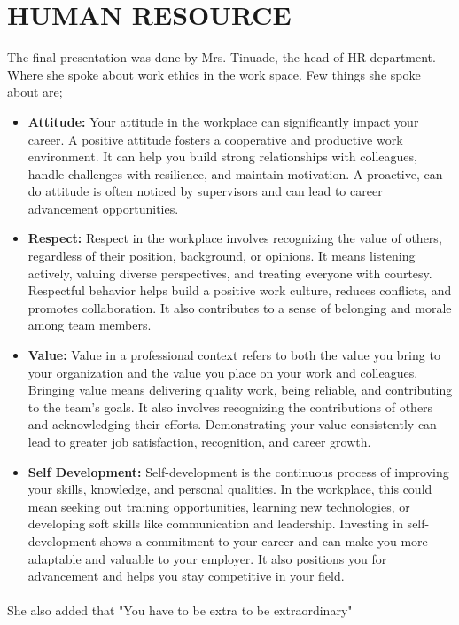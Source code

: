 \documentclass[a4paper,12pt]{report}
\begin{document}
\section[Human resource]{HUMAN RESOURCE}
The final presentation was done by Mrs. Tinuade, the head of HR department. Where she spoke about work ethics in the work space. Few things she spoke about are;
\begin{itemize}
    \item \textbf{Attitude:} Your attitude in the workplace can significantly impact your career. A positive attitude fosters a cooperative and productive work environment. It can help you build strong relationships with colleagues, handle challenges with resilience, and maintain motivation. A proactive, can-do attitude is often noticed by supervisors and can lead to career advancement opportunities.
    \item \textbf{Respect:} Respect in the workplace involves recognizing the value of others, regardless of their position, background, or opinions. It means listening actively, valuing diverse perspectives, and treating everyone with courtesy. Respectful behavior helps build a positive work culture, reduces conflicts, and promotes collaboration. It also contributes to a sense of belonging and morale among team members.
    \item \textbf{Value:} Value in a professional context refers to both the value you bring to your organization and the value you place on your work and colleagues. Bringing value means delivering quality work, being reliable, and contributing to the team's goals. It also involves recognizing the contributions of others and acknowledging their efforts. Demonstrating your value consistently can lead to greater job satisfaction, recognition, and career growth.
    \item \textbf{Self Development:} Self-development is the continuous process of improving your skills, knowledge, and personal qualities. In the workplace, this could mean seeking out training opportunities, learning new technologies, or developing soft skills like communication and leadership. Investing in self-development shows a commitment to your career and can make you more adaptable and valuable to your employer. It also positions you for advancement and helps you stay competitive in your field.
\end{itemize}
\paragraph{}
She also added that "You have to be extra to be extraordinary"
\end{document}

